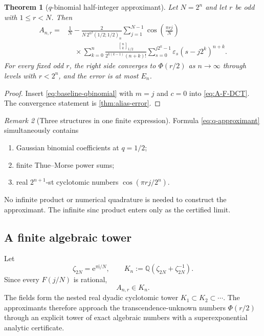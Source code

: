 \documentclass[11pt,oneside]{article}
\newtheorem{theorem}{Theorem}[section]
\theoremstyle{definition}
\theoremstyle{remark}
\newtheorem{remark}[theorem]{Remark}
\newcommand{\Q}{\mathbb Q}
\newcommand{\e}{\mathrm e}
\newcommand{\ii}{\mathrm i}
\newcommand{\eps}{\varepsilon}
\newcommand{\PhiU}{\Phi}
\newcommand{\qbinom}[3]{\genfrac{[}{]}{0pt}{}{#1}{#2}_{#3}}
\begin{document}
\begin{theorem}[$q$-binomial half-integer approximant]\label{thm:q-approximant}
Let $N=2^n$ and let $r$ be odd with $1\le r<N$.  Then
\begin{equation}\label{eq:q-approximant}
\boxed{
\begin{aligned}
 A_{n,r}={}&\frac1N-
 \frac{2}{N\,2^{n^2}(1/2;1/2)_n}
 \sum_{j=1}^{N-1}\cos\!\left(\frac{\pi rj}{N}\right)\\
 &\quad\times\sum_{k=0}^{n}
 \frac{\qbinom{n}{k}{1/2}}
 {2^{k(k-1)}(n+k)!}
 \sum_{s=0}^{j2^k-1}\eps_s(s-j2^k)^{n+k}.
\end{aligned}}
\end{equation}
For every fixed odd $r$, the right side converges to $\PhiU(r/2)$ as
$n\to\infty$ through levels with $r<2^n$, and the error is at most $E_n$.
\end{theorem}

\begin{proof}
Insert \eqref{eq:baseline-qbinomial} with $m=j$ and $c=0$ into
\eqref{eq:A-F-DCT}.  The convergence statement is
\cref{thm:alias-error}.
\end{proof}

\begin{remark}[Three structures in one finite expression]
Formula \eqref{eq:q-approximant} simultaneously contains
\begin{enumerate}
 \item Gaussian binomial coefficients at $q=1/2$;
 \item finite Thue--Morse power sums;
 \item real $2^{n+1}$-st cyclotomic numbers
 $\cos(\pi rj/2^n)$.
\end{enumerate}
No infinite product or numerical quadrature is needed to construct the
approximant.  The infinite sinc product enters only as the certified limit.
\end{remark}

\subsection{A finite algebraic tower}

Let
\begin{equation}\label{eq:cyclotomic-field}
 \zeta_{2N}=\e^{\pi\ii/N},
 \qquad
 K_n:=\Q(\zeta_{2N}+\zeta_{2N}^{-1}).
\end{equation}
Since every $F(j/N)$ is rational,
\begin{equation}\label{eq:A-in-K}
 A_{n,r}\in K_n.
\end{equation}
The fields form the nested real dyadic cyclotomic tower
$K_1\subset K_2\subset\cdots$.  The approximants therefore approach the
transcendence-unknown numbers $\PhiU(r/2)$ through an explicit tower of exact
algebraic numbers with a superexponential analytic certificate.
\end{document}
